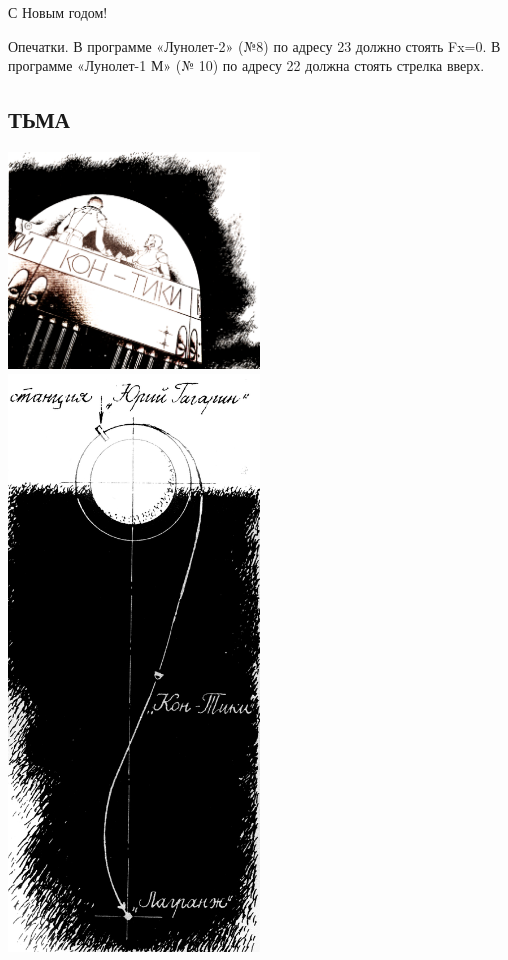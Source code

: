 \documentclass[11pt,a4paper,oneside]{article}
\begin{document}
С Новым годом!

Опечатки. В программе «Лунолет-2» (№8) по адресу 23 должно стоять Fx=0. В программе «Лунолет-1 М» (№ 10) по адресу 22 должна стоять стрелка вверх.

\subsection{ТЬМА}
\includegraphics[width=0.5\textwidth]{darkness}
\includegraphics[width=0.5\textwidth]{darkness2}
\end{document}
